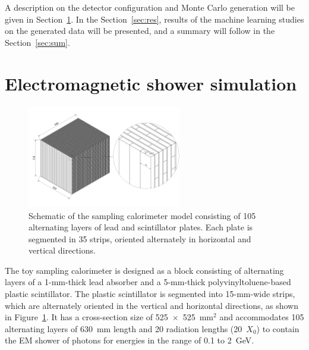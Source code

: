 \documentclass[12pt,times,draftclsnofoot,a4paper]{elsarticle}
\begin{document}
A description on the detector configuration and Monte Carlo generation will be given in Section~\ref{sec:ems}. In the Section~\ref{sec:res}, results of the machine learning studies on the generated data will be presented, and a summary will follow in the Section~\ref{sec:sum}. 

\section{Electromagnetic shower simulation}
\label{sec:ems}

\begin{figure}[!hbt]
\centering
\includegraphics[width=0.6\textwidth]{Fig1_detector_schematic.jpeg}
\caption{ Schematic of the sampling calorimeter model consisting of 105 alternating layers of lead and scintillator plates. Each plate is segmented in 35 strips, oriented alternately in horizontal and vertical directions. }
\label{fig:det_conf}
\end{figure}

The toy sampling calorimeter is designed as a block consisting of alternating layers of a 1-mm-thick lead absorber and a 5-mm-thick polyvinyltoluene-based plastic scintillator. The plastic scintillator is segmented into 15-mm-wide strips, which are alternately oriented in the vertical and horizontal directions, as shown in Figure~\ref{fig:det_conf}. It has a cross-section size of 525~$\times$~525~mm$^{2}$ and accommodates 105 alternating layers of 630~mm length and 20 radiation lengths (20~$X_{0}$) to contain the EM shower of photons for energies in the range of 0.1 to 2~GeV.
\end{document}

